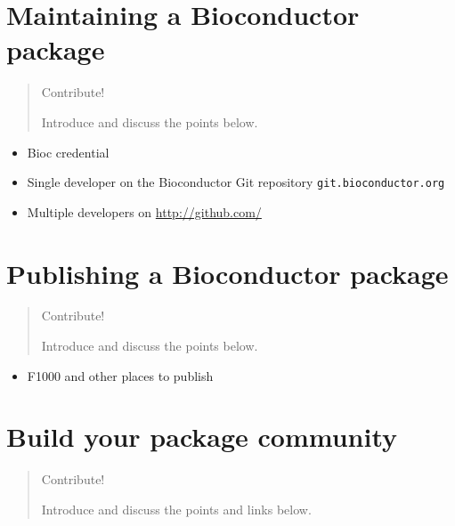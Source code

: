 \documentclass[
]{book}
\providecommand{\tightlist}{%
  \setlength{\itemsep}{0pt}\setlength{\parskip}{0pt}}
\begin{document}
\hypertarget{maintenance}{%
\chapter{Maintaining a Bioconductor package}\label{maintenance}}

\begin{quote}
Contribute!

Introduce and discuss the points below.
\end{quote}

\begin{itemize}
\tightlist
\item
  Bioc credential
\item
  Single developer on the Bioconductor Git repository \texttt{git.bioconductor.org}
\item
  Multiple developers on \url{http://github.com/}
\end{itemize}

\hypertarget{publish}{%
\chapter{Publishing a Bioconductor package}\label{publish}}

\begin{quote}
Contribute!

Introduce and discuss the points below.
\end{quote}

\begin{itemize}
\tightlist
\item
  F1000 and other places to publish
\end{itemize}

\hypertarget{package-community}{%
\chapter{Build your package community}\label{package-community}}

\begin{quote}
Contribute!

Introduce and discuss the points and links below.
\end{quote}
\end{document}
